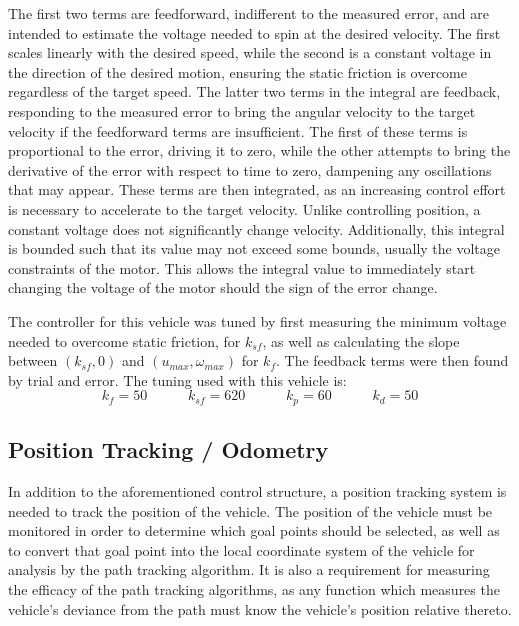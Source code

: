 \documentclass[12pt]{article}
\begin{document}
\begin{flushleft}
The first two terms are feedforward, indifferent to the measured error, and are intended to estimate the voltage needed to spin at the desired velocity. The first scales linearly with the desired speed, while the second is a constant voltage in the direction of the desired motion, ensuring the static friction is overcome regardless of the target speed. The latter two terms in the integral are feedback, responding to the measured error to bring the angular velocity to the target velocity if the feedforward terms are insufficient. The first of these terms is proportional to the error, driving it to zero, while the other attempts to bring the derivative of the error with respect to time to zero, dampening any oscillations that may appear. These terms are then integrated, as an increasing control effort is necessary to accelerate to the target velocity. Unlike controlling position, a constant voltage does not significantly change velocity. Additionally, this integral is bounded such that its value may not exceed some bounds, usually the voltage constraints of the motor. This allows the integral value to immediately start changing the voltage of the motor should the sign of the error change.

The controller for this vehicle was tuned by first measuring the minimum voltage needed to overcome static friction, for $k_{sf}$, as well as calculating the slope between $(k_{sf}, 0)$ and $(u_{max},\omega_{max})$ for $k_f$. The feedback terms were then found by trial and error. The tuning used with this vehicle is:
\begin{equation}
k_f=50\hspace{35pt}
k_{sf}=620 \hspace{35pt}
k_p=60 \hspace{35pt}
k_d=50
\nonumber
\end{equation}

\subsection{Position Tracking / Odometry}

In addition to the aforementioned control structure, a position tracking system is needed to track the position of the vehicle. The position of the vehicle must be monitored in order to determine which goal points should be selected, as well as to convert that goal point into the local coordinate system of the vehicle for analysis by the path tracking algorithm. It is also a requirement for measuring the efficacy of the path tracking algorithms, as any function which measures the vehicle's deviance from the path must know the vehicle's position relative thereto.


\end{flushleft}
\end{document}
